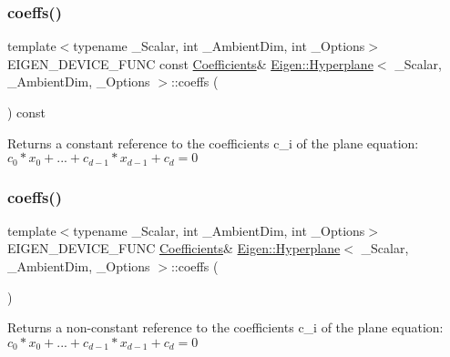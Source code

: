 \subsubsection{\texorpdfstring{coeffs()}{coeffs()}\hspace{0.1cm}{\footnotesize\ttfamily [1/2]}}
{\footnotesize\ttfamily template$<$typename \+\_\+\+Scalar, int \+\_\+\+Ambient\+Dim, int \+\_\+\+Options$>$ \\
E\+I\+G\+E\+N\+\_\+\+D\+E\+V\+I\+C\+E\+\_\+\+F\+U\+NC const \mbox{\hyperlink{class_eigen_1_1_matrix}{Coefficients}}\& \mbox{\hyperlink{class_eigen_1_1_hyperplane}{Eigen\+::\+Hyperplane}}$<$ \+\_\+\+Scalar, \+\_\+\+Ambient\+Dim, \+\_\+\+Options $>$\+::coeffs (\begin{DoxyParamCaption}{ }\end{DoxyParamCaption}) const\hspace{0.3cm}{\ttfamily [inline]}}

\begin{DoxyReturn}{Returns}
a constant reference to the coefficients c\+\_\+i of the plane equation\+: $ c_0*x_0 + ... + c_{d-1}*x_{d-1} + c_d = 0 $ 
\end{DoxyReturn}
\mbox{\label{class_eigen_1_1_hyperplane_a78975a8404b60f9eb032a80c6827338a}} 
\subsubsection{\texorpdfstring{coeffs()}{coeffs()}\hspace{0.1cm}{\footnotesize\ttfamily [2/2]}}
{\footnotesize\ttfamily template$<$typename \+\_\+\+Scalar, int \+\_\+\+Ambient\+Dim, int \+\_\+\+Options$>$ \\
E\+I\+G\+E\+N\+\_\+\+D\+E\+V\+I\+C\+E\+\_\+\+F\+U\+NC \mbox{\hyperlink{class_eigen_1_1_matrix}{Coefficients}}\& \mbox{\hyperlink{class_eigen_1_1_hyperplane}{Eigen\+::\+Hyperplane}}$<$ \+\_\+\+Scalar, \+\_\+\+Ambient\+Dim, \+\_\+\+Options $>$\+::coeffs (\begin{DoxyParamCaption}{ }\end{DoxyParamCaption})\hspace{0.3cm}{\ttfamily [inline]}}

\begin{DoxyReturn}{Returns}
a non-\/constant reference to the coefficients c\+\_\+i of the plane equation\+: $ c_0*x_0 + ... + c_{d-1}*x_{d-1} + c_d = 0 $ 
\end{DoxyReturn}
\mbox{\label{class_eigen_1_1_hyperplane_a44f0dab75a838cdadf1df9150648b8ed}} 
